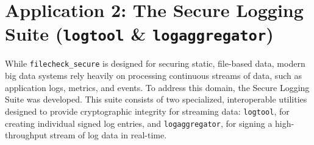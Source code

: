 \documentclass[12pt, letterpaper]{article}
\begin{document}
%		
%	
%		
%			
%			
%			
\section{Application 2: The Secure Logging Suite (\texttt{logtool} \& \texttt{logaggregator})}
While \texttt{filecheck\_secure} is designed for securing static, file-based data, modern big data systems rely heavily on processing continuous streams of data, such as application logs, metrics, and events. To address this domain, the Secure Logging Suite was developed. This suite consists of two specialized, interoperable utilities designed to provide cryptographic integrity for streaming data: \texttt{logtool}, for creating individual signed log entries, and \texttt{logaggregator}, for signing a high-throughput stream of log data in real-time.
\end{document}
